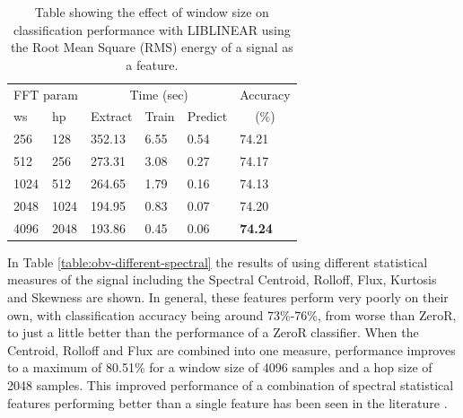 \begin{table}
\begin{tabular}{|l|l|l|l|l|l|}
\hline
\multicolumn{2}{|c|}{FFT param} & \multicolumn{3}{c|}{Time (sec)} & Accuracy \\
\hhline{|-|-|-|-|-|~|}
ws & hp & Extract & Train & Predict & \multicolumn{1}{c|}{(\%)} \\
\hhline{|=|=|=|=|=|=|}
256 & 128    &   352.13  &    6.55  &   0.54  &  74.21  \\
512 & 256    &   273.31  &    3.08  &   0.27  &  74.17  \\
1024 & 512   &   264.65  &    1.79  &   0.16  &  74.13  \\
2048 & 1024  &   194.95  &    0.83  &   0.07  &  74.20  \\
4096 & 2048  &   193.86  &    0.45  &   0.06  &  \textbf{74.24}  \\
\hline
\end{tabular}
\caption{Table showing the effect of window size on classification
  performance with LIBLINEAR using the Root Mean Square (RMS) energy
  of a signal as a feature.}
\label{table:obv-different-rms}
\end{table}

In Table \ref{table:obv-different-spectral} the results of using
different statistical measures of the signal including the Spectral
Centroid, Rolloff, Flux, Kurtosis and Skewness are shown.  In general,
these features perform very poorly on their own, with classification
accuracy being around 73\%-76\%, from worse than ZeroR, to just a
little better than the performance of a ZeroR classifier.  When the
Centroid, Rolloff and Flux are combined into one measure, performance
improves to a maximum of 80.51\% for a window size of 4096 samples and
a hop size of 2048 samples.  This improved performance of a
combination of spectral statistical features performing better than a
single feature has been seen in the literature
\cite{tzanetakis2008marsyas}.

